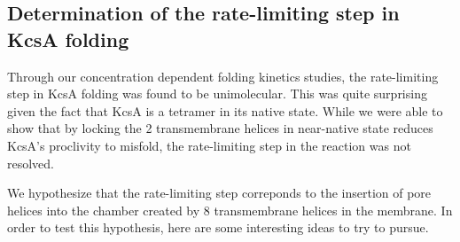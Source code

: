 \subsection{Determination of the rate-limiting step in KcsA folding}
Through our concentration dependent folding kinetics studies, the rate-limiting step in KcsA folding was found to be unimolecular. This was quite surprising given the fact that KcsA is a tetramer in its native state. While we were able to show that by locking the 2 transmembrane helices in near-native state reduces KcsA's proclivity to misfold, the rate-limiting step in the reaction was not resolved.

We hypothesize that the rate-limiting step correponds to the insertion of pore helices into the chamber created by 8 transmembrane helices in the membrane. In order to test this hypothesis, here are some interesting ideas to try to pursue. 




